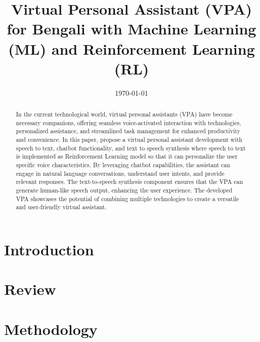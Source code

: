 \documentclass[conference]{IEEEtran}
\title{Virtual Personal Assistant (VPA) for Bengali with Machine Learning (ML) and Reinforcement Learning (RL)}
\author{\IEEEauthorblockN{Sadidul Islam}
\IEEEauthorblockA{\textit{Student, MSCSE} \\
\textit{United Internation University}\\
Bangladesh \\
sadid@soceton.com}
}
\date{\today}
\begin{document}
\maketitle

\begin{abstract}
    In the current technological world, virtual personal assistants (VPA) have become necessary companions, offering seamless voice-activated interaction with technologies, personalized assistance, and streamlined task management for enhanced productivity and convenience.
    In this paper, propose a virtual personal assistant development with speech to text, chatbot functionality, and text to speech synthesis where speech to text is implemented as Reinforcement Learning model so that it can personalize the user specific voice characteristics.
    By leveraging chatbot capabilities, the assistant can engage in natural language conversations, understand user intents, and provide relevant responses.
    The text-to-speech synthesis component ensures that the VPA can generate human-like speech output, enhancing the user experience.
    The developed VPA showcases the potential of combining multiple technologies to create a versatile and user-friendly virtual assistant.
\end{abstract}

\section{Introduction}\label{sec:introduction}


\section{Review}\label{sec:review}


\section{Methodology}\label{sec:methodology}




\end{document}

